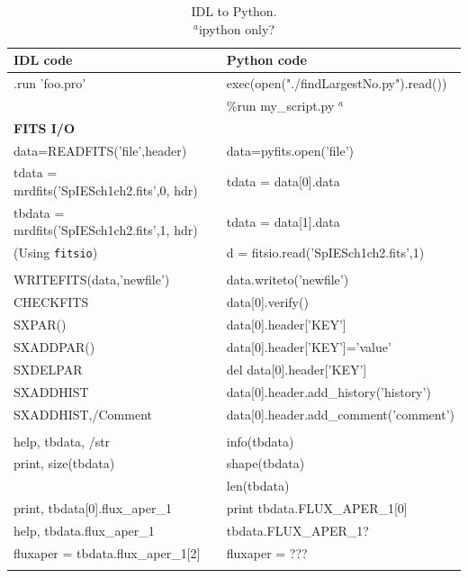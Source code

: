 \documentclass[11pt,a4paper]{article}
\begin{document}
\begin{appendices}
\begin{table}[h]
  \begin{center}
    \setlength{\tabcolsep}{4pt}
    \begin{tabular}{ll}
      \hline\hline
      IDL code   & Python code \\
      \hline 
      .run 'foo.pro'  & exec(open("./findLargestNo.py").read())\\
                            & \%run my\_script.py  $^{a}$\\
      \multicolumn{2}{l}{\bf FITS I/O} \\
      data=READFITS('file',header) 	                  & data=pyfits.open('file')\\
      tdata  = mrdfits('SpIESch1ch2.fits',0, hdr)   & tdata = data[0].data \\
      tbdata = mrdfits('SpIESch1ch2.fits',1, hdr)  & tdata = data[1].data \\
      (Using {\tt fitsio})                                          & d = fitsio.read('SpIESch1ch2.fits',1) \\
      & \\
      WRITEFITS(data,'newfile')	                          & data.writeto('newfile')	\\
      CHECKFITS	                                          & data[0].verify()	\\
      SXPAR()                                                        & data[0].header['KEY']	\\
      SXADDPAR()	                                          &  data[0].header['KEY']='value' \\
      SXDELPAR                          & del data[0].header['KEY']	\\ 
      SXADDHIST	                & data[0].header.add\_history('history')	\\
      SXADDHIST,/Comment	& data[0].header.add\_comment('comment')	\\
      & \\
      help, tbdata, /str                                  & info(tbdata)\\
      print, size(tbdata)                                 & shape(tbdata)\\
                                                                   & len(tbdata)\\
      print, tbdata[0].flux\_aper\_1               & print tbdata.FLUX\_APER\_1[0]\\
      help, tbdata.flux\_aper\_1                   & tbdata.FLUX\_APER\_1? \\
      fluxaper = tbdata.flux\_aper\_1[2]      & fluxaper = ??? \\
      \hline 
      \hline
      \label{tab:IDL2Python}
    \end{tabular}
    \caption{IDL to Python. \\
       $^{a}$ipython only?
       }
    \label{table:idl_vs_python}
  \end{center}
\end{table}


\end{appendices}
\end{document}
